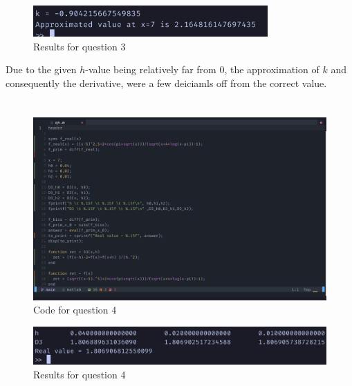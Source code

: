 \documentclass{article}
\begin{document}
\begin{figure}[H]
	\centering
	\includegraphics[width=0.8\textwidth]{imgs/q3_results.png}
	\caption{Results for question 3}
	\label{fig:q3_result}
\end{figure}
Due to the given $h$-value being relatively far from $0$, the approximation of $k$ and consequently the derivative, were a few deiciamls off from the correct value.

\newpage
\section{}
\begin{figure}[H]
	\centering
	\includegraphics[width=\textwidth]{imgs/q4_code.png}
	\caption{Code for question 4}
	\label{fig:q4_code}
\end{figure}

\begin{figure}[H]
	\centering
	\includegraphics[width=\textwidth]{imgs/q4_results.png}
	\caption{Results for question 4}
	\label{fig:q4_result}
\end{figure}

\newpage
\section{}
\end{document}
